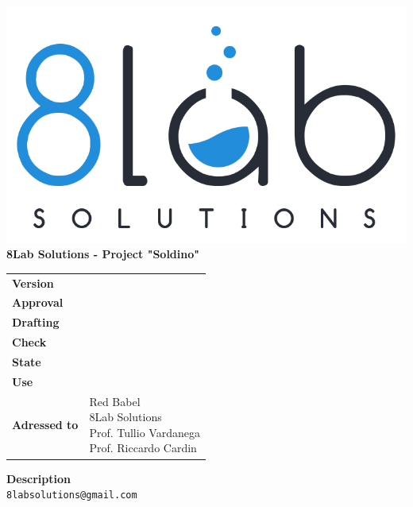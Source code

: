 \thispagestyle{empty}
\begin{titlepage}
	\begin{center}
		\includegraphics[scale = 0.3]{res/images/logo8_crop.png}\\
		\large \textbf{8Lab Solutions - Project "Soldino"} \\
		\vfill
		\Huge \textbf{\doctitle}
		\vspace*{\fill}
        
        \vfill
        \large
    \end{center}
	\begin{table}[htbp]
        \centering
        \hspace*{2cm}
        \begin{tabular}{l|l}
            \textbf{Version} & \rev{} \\
            \textbf{Approval} & \approv{} \\
            \textbf{Drafting} & \red{} \\
            \textbf{Check} & \ver{} \\
            \textbf{State} & \stato{} \\
            \textbf{Use} & \uso{} \\
            \textbf{Adressed to} & \parbox[t]{5cm}{Red Babel \\8Lab Solutions
            \\Prof. Tullio Vardanega\\Prof. Riccardo Cardin}
        \end{tabular}
    \end{table}
    \begin{center}
        \vfill
        \normalsize
        \textbf{Description}\\
		\describedoc
        \vfill
        \small
        \texttt{8labsolutions@gmail.com}
	\end{center}
\end{titlepage}
